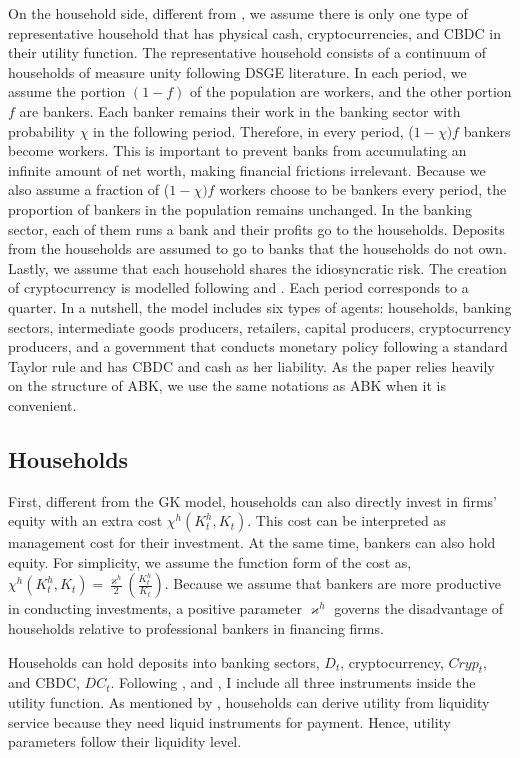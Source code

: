 \documentclass[12pt, a4paper]{article}
\begin{document}
On the household side, different from \cite{murakami2021cryptocurrencies}, we assume there is only one type of representative household that has physical cash, cryptocurrencies, and CBDC in their utility function. The representative household consists of a continuum of households of measure unity following DSGE literature. In each period, we assume the portion $(1-f)$ of the population are workers, and the other portion $f$ are bankers. Each banker remains their work in the banking sector with probability $\chi$ in the following period. Therefore, in every period,  ($1-\chi )f$ bankers become workers. This is important to prevent banks from accumulating an infinite amount of net worth, making financial frictions irrelevant. Because we also assume a fraction of ($1-\chi )f$ workers choose to be bankers every period,  the proportion of bankers in the population remains unchanged. In the banking sector, each of them runs a bank and their profits go to the households. Deposits from the households are assumed to go to banks that the households do not own. Lastly, we assume that each household shares the idiosyncratic risk. The creation of cryptocurrency is modelled following \cite{sockin2018model} and \cite{asimakopoulos2019new}. Each period corresponds to a quarter. In a nutshell, the model includes six types of agents: households, banking sectors, intermediate goods producers,  retailers, capital producers, cryptocurrency producers, and a government that conducts monetary policy following a standard Taylor rule and has CBDC and cash as her liability. As the paper relies heavily on the structure of ABK, we use the same notations as ABK when it is convenient.

\subsection{Households}
First, different from the GK model, households can also directly invest in firms' equity with an extra cost $\chi^h(K^h_t,K_t)$. This cost can be interpreted as management cost for their investment. At the same time, bankers can also hold equity. For simplicity, we assume the function form of the cost as, $\chi^h(K^h_t,K_t) = \frac{\varkappa^h}{2}\left(\frac{K^h_t}{K_t}\right)$. Because we assume that bankers are more productive in conducting investments, a positive parameter $\varkappa^h$ governs the disadvantage of households relative to professional bankers in financing firms.

Households can hold deposits into banking sectors, $D_t$, cryptocurrency, $Cryp_{t}$, and CBDC, $DC_{t}$. Following \cite{asimakopoulos2019new}, \cite{murakami2021cryptocurrencies} and \cite{minesso2022central}, I include all three instruments inside the utility function. As mentioned by \cite{woodford2003interest}, households can derive utility from liquidity service because they need liquid instruments for payment. Hence, utility parameters follow their liquidity level. 
\end{document}
